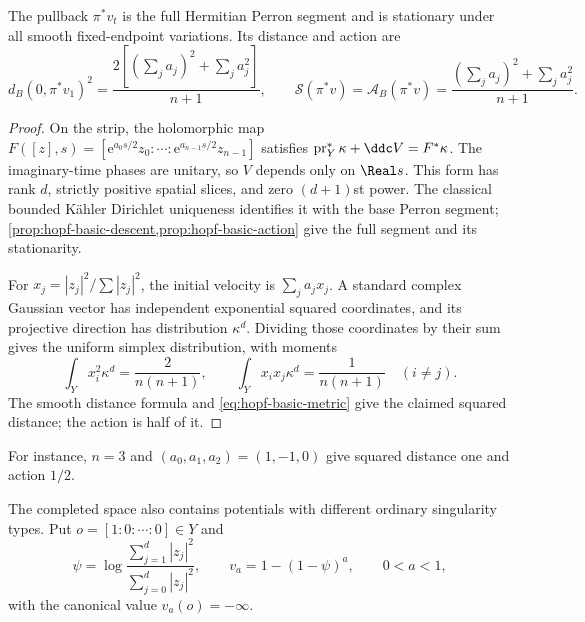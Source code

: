 \begin{proposition}\label{prop:hopf-diagonal-geodesic}
The pullback $\pi^*v_t$ is the full Hermitian Perron segment and is stationary under all smooth fixed-endpoint variations. Its distance and action are
\[
 d_B(0,\pi^*v_1)^2=\frac{2[(\sum_ja_j)^2+\sum_ja_j^2]}{n+1},
 \qquad
 \mathscr S(\pi^*v)=\mathcal A_B(\pi^*v)
 =\frac{(\sum_ja_j)^2+\sum_ja_j^2}{n+1}.
\]
\end{proposition}
\begin{proof}
On the strip, the holomorphic map
$F([z],s)=[\mathrm e^{a_0s/2}z_0:\cdots:\mathrm e^{a_{n-1}s/2}z_{n-1}]$
satisfies $\operatorname{pr}_Y^*\kappa+\ddc V=F^*\kappa$. The imaginary-time phases are unitary, so $V$ depends only on $\Real s$. This form has rank $d$, strictly positive spatial slices, and zero $(d+1)$st power. The classical bounded K\"ahler Dirichlet uniqueness identifies it with the base Perron segment; \cref{prop:hopf-basic-descent,prop:hopf-basic-action} give the full segment and its stationarity.

For $x_j=|z_j|^2/\sum|z_j|^2$, the initial velocity is $\sum_ja_jx_j$. A standard complex Gaussian vector has independent exponential squared coordinates, and its projective direction has distribution $\kappa^d$. Dividing those coordinates by their sum gives the uniform simplex distribution, with moments
\[
 \int_Yx_i^2\kappa^d=\frac2{n(n+1)},
 \qquad \int_Yx_ix_j\kappa^d=\frac1{n(n+1)}\quad(i\ne j).
\]
The smooth distance formula and \eqref{eq:hopf-basic-metric} give the claimed squared distance; the action is half of it.
\end{proof}

For instance, $n=3$ and $(a_0,a_1,a_2)=(1,-1,0)$ give squared distance one and action $1/2$.

The completed space also contains potentials with different ordinary singularity types. Put $o=[1:0:\cdots:0]\in Y$ and
\[
 \psi=\log\frac{\sum_{j=1}^d|z_j|^2}{\sum_{j=0}^d|z_j|^2},
 \qquad v_a=1-(1-\psi)^a,\qquad0<a<1,
\]
with the canonical value $v_a(o)=-\infty$.

